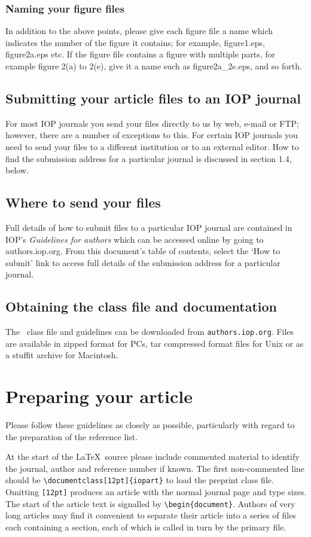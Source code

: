 \documentclass[12pt]{iopart}
\begin{document}
\subsubsection{\label{fname}Naming your figure files} In addition to the above points, please give each figure file a name which indicates the number of the figure it contains; for example, figure1.eps, figure2a.eps etc. If the figure file contains a figure with multiple parts, for example figure 2(a) to 2(e), give it a name such as figure2a\_2e.eps, and so forth.
\subsection{Submitting your article files to an IOP journal}
For most IOP journals you send your files directly to us by web, e-mail or FTP; however, there are a number of exceptions to this. For certain IOP journals you need to send your files to a different institution or to an external editor. How to find the submission address for a particular journal is discussed in section 1.4, below.
\subsection{Where to send your files \label{agide}}
Full details of how to submit files to a particular IOP journal are contained in IOP's {\it Guidelines for authors} which can be accessed online by going to authors.iop.org. From this document's table of contents, select the `How to submit' link to access full details of the submission address for a particular journal.

\subsection{Obtaining the class file and documentation}
The  \LaTeXe\ class file and guidelines can be downloaded from \verb"authors.iop.org".
Files are available in zipped format for PCs, tar compressed format files for
Unix or as a stuffit archive for Macintosh. 

\section{Preparing your article}

Please follow these guidelines as closely as possible, particularly with regard to the preparation of the reference list.

At the start of the \LaTeX\ source please include 
commented material to identify the journal, author and reference number if 
known. The first non-commented line should be 
\verb"\documentclass[12pt]{iopart}"  to load the preprint class 
file. Omitting \verb"[12pt]" produces an article with the normal journal
page and type sizes. The start of the article text is signalled by 
\verb"\begin{document}".
Authors of very long articles may find it convenient to separate 
their article into a series of files each containing a section, each of which is called 
in turn by the primary file. 
\end{document}
